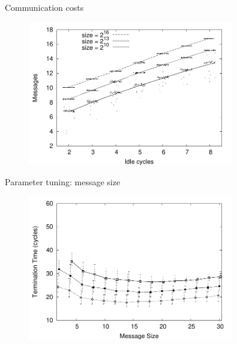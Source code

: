\begin{frame}{Communication costs}
	
\begin{figure}
	\includegraphics[width=0.80\textwidth]{figs/11/sort-inactive-msg}
\end{figure}	
	
\end{frame}

\begin{frame}{Parameter tuning: message size}
	
\begin{figure}
	\includegraphics[width=0.80\textwidth]{figs/11/sort-msgsize-time}
\end{figure}	
	
\end{frame}


